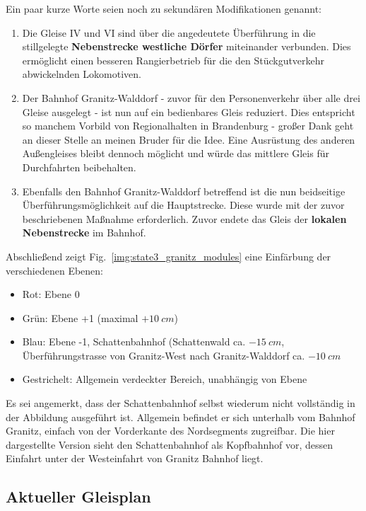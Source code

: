 Ein paar kurze Worte seien noch zu sekund\"aren Modifikationen genannt:
\begin{enumerate}
	\item Die Gleise IV und VI sind \"uber die angedeutete \"Uberf\"uhrung in die stillgelegte \textbf{Nebenstrecke westliche D\"orfer} miteinander verbunden.
	Dies erm\"oglicht einen besseren Rangierbetrieb f\"ur die den St\"uckgutverkehr abwickelnden Lokomotiven.
	\item Der Bahnhof Granitz-Walddorf - zuvor f\"ur den Personenverkehr \"uber alle drei Gleise ausgelegt - ist nun auf ein bedienbares Gleis reduziert.
	Dies entspricht so manchem Vorbild von Regionalhalten in Brandenburg - gro{\ss}er Dank geht an dieser Stelle an meinen Bruder f\"ur die Idee.
	Eine Ausr\"ustung des anderen Au{\ss}engleises bleibt dennoch m\"oglicht und w\"urde das mittlere Gleis f\"ur Durchfahrten beibehalten.
	\item Ebenfalls den Bahnhof Granitz-Walddorf betreffend ist die nun beidseitige \"Uberf\"uhrungsm\"oglichkeit auf die Hauptstrecke.
	Diese wurde mit der zuvor beschriebenen Ma{\ss}nahme erforderlich.
	Zuvor endete das Gleis der \textbf{lokalen Nebenstrecke} im Bahnhof.
\end{enumerate}

Abschlie{\ss}end zeigt Fig.~\ref{img:state3_granitz_modules} eine Einf\"arbung der verschiedenen Ebenen:
\begin{itemize}
	\item Rot: Ebene 0
	\item Gr\"un: Ebene +1 (maximal $+10~cm$)
	\item Blau: Ebene -1, Schattenbahnhof (Schattenwald ca. $-15~cm$, \"Uberf\"uhrungstrasse von Granitz-West nach Granitz-Walddorf ca. $-10~cm$
	\item Gestrichelt: Allgemein verdeckter Bereich, unabh\"angig von Ebene
\end{itemize}
Es sei angemerkt, dass der Schattenbahnhof selbst wiederum nicht vollst\"andig in der Abbildung ausgef\"uhrt ist.
Allgemein befindet er sich unterhalb vom Bahnhof Granitz, einfach von der Vorderkante des Nordsegments zugreifbar.
Die hier dargestellte Version sieht den Schattenbahnhof als Kopfbahnhof vor, dessen Einfahrt unter der Westeinfahrt von Granitz Bahnhof liegt.





\subsection{Aktueller Gleisplan}
\label{sec:map_date}

